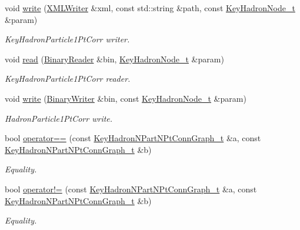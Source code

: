 \begin{DoxyCompactItemize}
void \mbox{\hyperlink{namespaceHadron_ab67658d0abad845f6efa3ba94de7692c}{write}} (\mbox{\hyperlink{classADATXML_1_1XMLWriter}{X\+M\+L\+Writer}} \&xml, const std\+::string \&path, const \mbox{\hyperlink{structHadron_1_1KeyHadronNode__t}{Key\+Hadron\+Node\+\_\+t}} \&param)
\begin{DoxyCompactList}\small\item\em Key\+Hadron\+Particle1\+Pt\+Corr writer. \end{DoxyCompactList}\item 
void \mbox{\hyperlink{namespaceHadron_ac376de4f56715288fc1a3eb4e0cc6725}{read}} (\mbox{\hyperlink{classADATIO_1_1BinaryReader}{Binary\+Reader}} \&bin, \mbox{\hyperlink{structHadron_1_1KeyHadronNode__t}{Key\+Hadron\+Node\+\_\+t}} \&param)
\begin{DoxyCompactList}\small\item\em Key\+Hadron\+Particle1\+Pt\+Corr reader. \end{DoxyCompactList}\item 
void \mbox{\hyperlink{namespaceHadron_a33192b7d206ee95549b4605c3db6cde8}{write}} (\mbox{\hyperlink{classADATIO_1_1BinaryWriter}{Binary\+Writer}} \&bin, const \mbox{\hyperlink{structHadron_1_1KeyHadronNode__t}{Key\+Hadron\+Node\+\_\+t}} \&param)
\begin{DoxyCompactList}\small\item\em Hadron\+Particle1\+Pt\+Corr write. \end{DoxyCompactList}\item 
bool \mbox{\hyperlink{namespaceHadron_ac884c28242a0aaf83a23169ef8ff5b2b}{operator==}} (const \mbox{\hyperlink{structHadron_1_1KeyHadronNPartNPtConnGraph__t}{Key\+Hadron\+N\+Part\+N\+Pt\+Conn\+Graph\+\_\+t}} \&a, const \mbox{\hyperlink{structHadron_1_1KeyHadronNPartNPtConnGraph__t}{Key\+Hadron\+N\+Part\+N\+Pt\+Conn\+Graph\+\_\+t}} \&b)
\begin{DoxyCompactList}\small\item\em Equality. \end{DoxyCompactList}\item 
bool \mbox{\hyperlink{namespaceHadron_aa8d535bf12152ca7f5f44d089e5db4b1}{operator!=}} (const \mbox{\hyperlink{structHadron_1_1KeyHadronNPartNPtConnGraph__t}{Key\+Hadron\+N\+Part\+N\+Pt\+Conn\+Graph\+\_\+t}} \&a, const \mbox{\hyperlink{structHadron_1_1KeyHadronNPartNPtConnGraph__t}{Key\+Hadron\+N\+Part\+N\+Pt\+Conn\+Graph\+\_\+t}} \&b)
\begin{DoxyCompactList}\small\item\em Equality. \end{DoxyCompactList}\item 

\end{DoxyCompactItemize}
